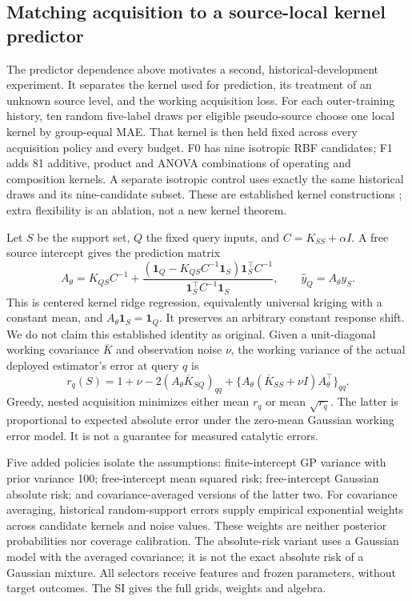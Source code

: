 \subsection{Matching acquisition to a source-local kernel predictor}
The predictor dependence above motivates a second, historical-development experiment. It separates the kernel used for prediction, its treatment of an unknown source level, and the working acquisition loss. For each outer-training history, ten random five-label draws per eligible pseudo-source choose one local kernel by group-equal MAE. That kernel is then held fixed across every acquisition policy and every budget. F0 has nine isotropic RBF candidates; F1 adds 81 additive, product and ANOVA combinations of operating and composition kernels. A separate isotropic control uses exactly the same historical draws and its nine-candidate subset. These are established kernel constructions \cite{gpml}; extra flexibility is an ablation, not a new kernel theorem.

Let $S$ be the support set, $Q$ the fixed query inputs, and $C=K_{SS}+\alpha I$. A free source intercept gives the prediction matrix
\begin{equation}\label{eq:matchedA}
A_\theta=K_{QS}C^{-1}+
\frac{(\mathbf1_Q-K_{QS}C^{-1}\mathbf1_S)\mathbf1_S^\top C^{-1}}
{\mathbf1_S^\top C^{-1}\mathbf1_S},\qquad \widehat y_Q=A_\theta y_S.
\end{equation}
This is centered kernel ridge regression, equivalently universal kriging with a constant mean, and $A_\theta\mathbf1_S=\mathbf1_Q$. It preserves an arbitrary constant response shift. We do not claim this established identity as original. Given a unit-diagonal working covariance $\overline K$ and observation noise $\nu$, the working variance of the actual deployed estimator's error at query $q$ is
\begin{equation}\label{eq:matchedrisk}
r_q(S)=1+\nu-2(A_\theta\overline K_{SQ})_{qq}
+\{A_\theta(\overline K_{SS}+\nu I)A_\theta^\top\}_{qq}.
\end{equation}
Greedy, nested acquisition minimizes either mean $r_q$ or mean $\sqrt{r_q}$. The latter is proportional to expected absolute error under the zero-mean Gaussian working error model. It is not a guarantee for measured catalytic errors.

Five added policies isolate the assumptions: finite-intercept GP variance with prior variance 100; free-intercept mean squared risk; free-intercept Gaussian absolute risk; and covariance-averaged versions of the latter two. For covariance averaging, historical random-support errors supply empirical exponential weights across candidate kernels and noise values. These weights are neither posterior probabilities nor coverage calibration. The absolute-risk variant uses a Gaussian model with the averaged covariance; it is not the exact absolute risk of a Gaussian mixture. All selectors receive features and frozen parameters, without target outcomes. The SI gives the full grids, weights and algebra.

